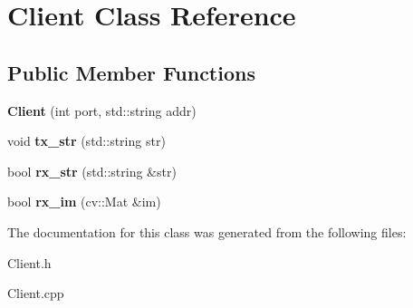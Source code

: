 \hypertarget{class_client}{}\section{Client Class Reference}
\label{class_client}
\subsection*{Public Member Functions}
\begin{DoxyCompactItemize}
\item 
\hypertarget{class_client_ae48ea283b08db8a87601a96690895a21}{}\label{class_client_ae48ea283b08db8a87601a96690895a21} 
{\bfseries Client} (int port, std\+::string addr)
\item 
\hypertarget{class_client_a91961b4d21399184db9e8a15207a2597}{}\label{class_client_a91961b4d21399184db9e8a15207a2597} 
void {\bfseries tx\+\_\+str} (std\+::string str)
\item 
\hypertarget{class_client_a02fd5ad5279d63db63c9db4f199dc410}{}\label{class_client_a02fd5ad5279d63db63c9db4f199dc410} 
bool {\bfseries rx\+\_\+str} (std\+::string \&str)
\item 
\hypertarget{class_client_a34e7dbb4238cfdd8ce5aa705da011853}{}\label{class_client_a34e7dbb4238cfdd8ce5aa705da011853} 
bool {\bfseries rx\+\_\+im} (cv\+::\+Mat \&im)
\end{DoxyCompactItemize}


The documentation for this class was generated from the following files\+:\begin{DoxyCompactItemize}
\item 
Client.\+h\item 
Client.\+cpp\end{DoxyCompactItemize}
